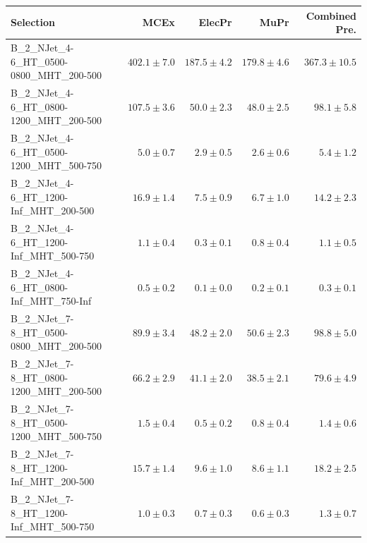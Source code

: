 \documentclass{beamer}
\begin{document}
\begin{frame}
\tiny
\begin{tabular}{lrrrr}
\toprule

                                                Selection  &                     MCEx  &           ElecPr  &             MuPr  &          Combined Pre.  \\
\midrule
     B\_2\_NJet\_4-6\_HT\_0500-0800\_MHT\_200-500 &             $402.1\pm7.0$&             $187.5\pm4.2$&             $179.8\pm4.6$&                $367.3\pm10.5$ \\
     B\_2\_NJet\_4-6\_HT\_0800-1200\_MHT\_200-500 &             $107.5\pm3.6$&              $50.0\pm2.3$&              $48.0\pm2.5$&                  $98.1\pm5.8$ \\
     B\_2\_NJet\_4-6\_HT\_0500-1200\_MHT\_500-750 &               $5.0\pm0.7$&               $2.9\pm0.5$&               $2.6\pm0.6$&                   $5.4\pm1.2$ \\
      B\_2\_NJet\_4-6\_HT\_1200-Inf\_MHT\_200-500 &              $16.9\pm1.4$&               $7.5\pm0.9$&               $6.7\pm1.0$&                  $14.2\pm2.3$ \\
      B\_2\_NJet\_4-6\_HT\_1200-Inf\_MHT\_500-750 &               $1.1\pm0.4$&               $0.3\pm0.1$&               $0.8\pm0.4$&                   $1.1\pm0.5$ \\
      B\_2\_NJet\_4-6\_HT\_0800-Inf\_MHT\_750-Inf &               $0.5\pm0.2$&               $0.1\pm0.0$&               $0.2\pm0.1$&                   $0.3\pm0.1$ \\
     B\_2\_NJet\_7-8\_HT\_0500-0800\_MHT\_200-500 &              $89.9\pm3.4$&              $48.2\pm2.0$&              $50.6\pm2.3$&                  $98.8\pm5.0$ \\
     B\_2\_NJet\_7-8\_HT\_0800-1200\_MHT\_200-500 &              $66.2\pm2.9$&              $41.1\pm2.0$&              $38.5\pm2.1$&                  $79.6\pm4.9$ \\
     B\_2\_NJet\_7-8\_HT\_0500-1200\_MHT\_500-750 &               $1.5\pm0.4$&               $0.5\pm0.2$&               $0.8\pm0.4$&                   $1.4\pm0.6$ \\
      B\_2\_NJet\_7-8\_HT\_1200-Inf\_MHT\_200-500 &              $15.7\pm1.4$&               $9.6\pm1.0$&               $8.6\pm1.1$&                  $18.2\pm2.5$ \\
      B\_2\_NJet\_7-8\_HT\_1200-Inf\_MHT\_500-750 &               $1.0\pm0.3$&               $0.7\pm0.3$&               $0.6\pm0.3$&                   $1.3\pm0.7$ \\

\end{tabular}
\end{frame}
\end{document}
